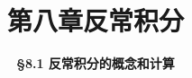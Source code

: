 \everymath{\displaystyle}



\title[第八章\\
反常积分]{\texorpdfstring{\LARGE \bfseries 第八章\quad 反常积分}{第八章 反常积分}} %
\author[\smaller \S 8.1\\
反常积分概念和计算] %
{\Large \bfseries \S 8.1 反常积分的概念和计算}
\date{}





\begin{frame}

\titlepage %

\end{frame}





